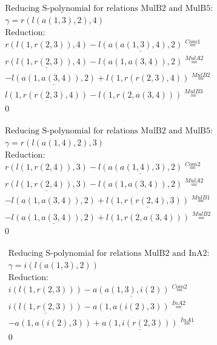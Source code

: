 \documentclass[11pt]{amsart}
\begin{document}
\begin{align*} 
& \text{Reducing S-polynomial for relations MulB2 and MulB5:} \\ 
& \gamma = r(l(a(1,3),2),4) \\ 
& \text{Reduction}: \\&r(l(1,r(2,3)),4) - \underline{l(a(a(1,3),4),2)} \stackrel{ Com1 }{=}  \\ 
&\underline{r(l(1,r(2,3)),4)} - l(a(1,a(3,4)),2) \stackrel{ MulA2 }{=}  \\ 
& - \underline{l(a(1,a(3,4)),2)} + l(1,r(r(2,3),4)) \stackrel{ MulB2 }{=}  \\ 
&\underline{l(1,r(r(2,3),4))} - l(1,r(2,a(3,4))) \stackrel{ MulB3 }{=}  \\ 
&0\\ 
\end{align*} 
 
\begin{align*} 
& \text{Reducing S-polynomial for relations MulB2 and MulB5:} \\ 
& \gamma = r(l(a(1,4),2),3) \\ 
& \text{Reduction}: \\&r(l(1,r(2,4)),3) - \underline{l(a(a(1,4),3),2)} \stackrel{ Com2 }{=}  \\ 
&\underline{r(l(1,r(2,4)),3)} - l(a(1,a(3,4)),2) \stackrel{ MulA2 }{=}  \\ 
& - l(a(1,a(3,4)),2) + \underline{l(1,r(r(2,4),3))} \stackrel{ MulB1 }{=}  \\ 
& - \underline{l(a(1,a(3,4)),2)} + l(1,r(2,a(3,4))) \stackrel{ MulB2 }{=}  \\ 
&0\\ 
\end{align*} 
 
\begin{align*} 
& \text{Reducing S-polynomial for relations MulB2 and InA2:} \\ 
& \gamma = i(l(a(1,3),2)) \\ 
& \text{Reduction}: \\&i(l(1,r(2,3))) - \underline{a(a(1,3),i(2))} \stackrel{ Com2 }{=}  \\ 
&\underline{i(l(1,r(2,3)))} - a(1,a(i(2),3)) \stackrel{ InA2 }{=}  \\ 
& - a(1,a(i(2),3)) + \underline{a(1,i(r(2,3)))} \stackrel{ InA1 }{=}  \\ 
&0\\ 
\end{align*} 
 
\end{document}
